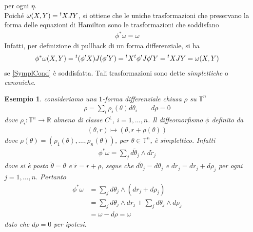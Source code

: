 \documentclass[twoside, 11pt]{amsbook}
\newcommand{\0}{{(0)}}
\newcommand{\3}{{(3)}}
\theoremstyle{colonplain}
\theoremstyle{colondefinition}
\newtheorem{ex}[thm]{Esempio}
\theoremstyle{colonremark}
\numberwithin{equation}{chapter}
\begin{document}
per ogni $\eta$. \\
Poiché $\omega(X, Y) = \null^t X J Y$, si ottiene che le uniche trasformazioni che preservano la forma delle equazioni di Hamilton sono le trasformazioni che soddisfano
\begin{align}
    \phi^*\omega = \omega
\end{align}
Infatti, per definizione di pullback di un forma differenziale, si ha
\begin{align}
    \phi^*\omega(X, Y) = \null^t(\phi' X)J(\phi' Y) = \null^tX \null^t\phi' J \phi' Y = \null^tX J Y = \omega(X, Y)
\end{align}
se \eqref{SymplCond} è soddisfatta. Tali trasformazioni sono dette \textit{simplettiche} o \textit{canoniche}.
\begin{ex} consideriamo una $1$-forma differenziale chiusa $\rho$ su $\mathbb{T}^n$
\begin{align}
    \rho = \sum_i \rho_i(\theta)d\theta_i \qquad d\rho = 0 
\end{align}
dove $\rho_i : \mathbb{T}^n \longrightarrow \mathbb{R}$ almeno di classe $C^1$, $i = 1, \dots, n$. Il diffeomorfismo $\phi$ definito da 
\begin{align}
    (\theta, r) \mapsto (\theta, r + \rho(\theta)) 
\end{align}
dove $\rho(\theta) = (\rho_1(\theta), \dots, \rho_n(\theta))$, per $\theta \in \mathbb{T}^n$, è simplettico. Infatti
\begin{align}
    \phi^*\omega = \sum_j d\tilde{\theta}_j \wedge d\tilde{r}_j 
\end{align}
dove si è posto $\tilde{\theta} = \theta$ e $\tilde{r} = r + \rho$, segue che $d\tilde{\theta}_j = d\theta_j$ e $d\tilde{r}_j = dr_j + d\rho_j$ per ogni $j = 1, \dots, n$. Pertanto
\begin{align}
    \phi^*\omega &= \sum_j d\theta_j \wedge (dr_j + d\rho_j) \\
    &= \sum_j d\theta_j \wedge dr_j + \sum_j d\theta_j \wedge d\rho_j \\
    &= \omega - d\rho = \omega 
\end{align}
dato che $d\rho = 0$ per ipotesi.
\end{ex}
\end{document}
